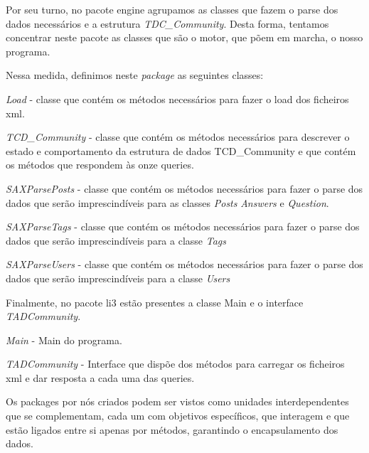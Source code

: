 \documentclass[a4paper]{article}
\begin{document}
Por seu turno, no pacote engine agrupamos as classes que fazem o parse dos
dados necessários e a estrutura \textit{TDC\_Community}. Desta forma, tentamos
concentrar neste pacote as classes que são o motor, que põem em marcha,
o nosso programa.\par
Nessa medida, definimos neste \textit{package} as seguintes classes:
\begin{itemize}
\begin{item} \textit{Load} - classe que contém os métodos necessários para fazer
o load dos ficheiros xml.\end{item}
\begin{item} \textit{TCD\_Community} - classe que contém os métodos necessários
para descrever o estado e comportamento da estrutura de dados TCD\_Community e
que contém os métodos que respondem às onze queries.\end{item}
\begin{item} \textit{SAXParsePosts} - classe que contém os métodos necessários
para fazer o parse dos dados que serão imprescindíveis para as classes
\textit{Posts} \textit{Answers} e \textit{Question}.\end{item}
\begin{item} \textit{SAXParseTags} - classe que contém os métodos necessários
para fazer o parse dos dados que serão imprescindíveis para a classe
\textit{Tags}\end{item}
\begin{item} \textit{SAXParseUsers} - classe que contém os métodos necessários
para fazer o parse dos dados que serão imprescindíveis para a classe
\textit{Users}\end{item}
\end{itemize}

Finalmente, no pacote li3 estão presentes a classe Main e o interface \textit{TADCommunity}.
\begin{itemize}
\begin{item} \textit{Main} - Main do programa.\end{item}
\begin{item} \textit{TADCommunity} - Interface que dispõe dos métodos para carregar
os ficheiros xml e dar resposta a cada uma das queries.\end{item}
\end{itemize}


Os packages por nós criados podem ser vistos como unidades interdependentes que se
complementam, cada um com objetivos específicos, que interagem e que estão ligados
entre si apenas por métodos, garantindo o encapsulamento dos dados.
\end{document}
